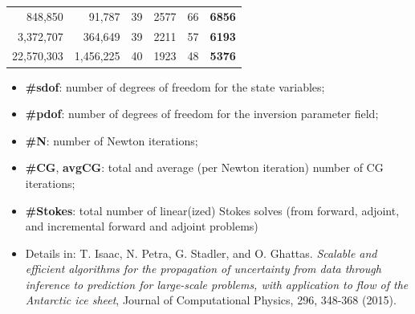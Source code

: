 \documentclass[10pt,final,xcolor=dvipsnames]{beamer}
\begin{document}
\begin{frame}
{\begin{table}
\begin{center}
\begin{tabular}{|r|r|r|r|r|r|}
        848,850 &  91,787 &  39 &  2577 &    66        &     {\bf\alert{6856}} \\
        3,372,707 & 364,649 &  39 &  2211 &    57       &     {\bf\alert{6193}} \\
        22,570,303 & 1,456,225 &  40 &  1923 &    48     &     {\bf\alert{5376}}\\
        \hline
  \end{tabular}
\end{center}
\end{table}
  }
  
\small
\begin{itemize}
\item {\bf \#sdof}: number of degrees of freedom for the
  state variables;
\item {\bf \#pdof}: number of degrees of freedom for the
  inversion parameter field;
\item {\bf \#N}: number of Newton iterations;
\item {\bf \#CG}, {\bf avgCG}: total and average (per Newton
  iteration) number of CG iterations;
\item {\bf \#Stokes}: total number of
  linear(ized) Stokes solves (from forward, adjoint, and incremental
  forward and adjoint problems)
\end{itemize}

\begin{itemize}
\item [] \scriptsize{Details in: T. Isaac, N. Petra, G. Stadler, and
  O. Ghattas. {\em Scalable and efficient algorithms for the
    propagation of uncertainty from data through inference to
    prediction for large-scale problems, with application to flow of
    the Antarctic ice sheet}, Journal of Computational Physics, 296,
  348-368 (2015).}
\end{itemize}

\end{frame}
\end{document}
